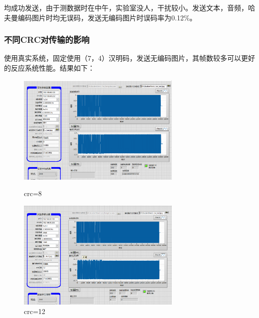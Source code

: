 \documentclass[UTF8]{ctexart}
\begin{document}
均成功发送，由于测数据时在中午，实验室没人，干扰较小。发送文本，音频，哈夫曼编码图片时均无误码，发送无编码图片时误码率为0.12\%。

\newpage

\subsubsection{不同CRC对传输的影响}

使用真实系统，固定使用（7，4）汉明码，发送无编码图片，其帧数较多可以更好的反应系统性能。结果如下：

\begin{figure}[H]
    \centering
    \includegraphics[width=0.7\textwidth]{pics/74Hcrc8_pics.png}
    \caption{crc=8}
    \includegraphics[width=0.7\textwidth]{pics/crc12.png}
    \caption{crc=12}

\end{figure}
\end{document}
